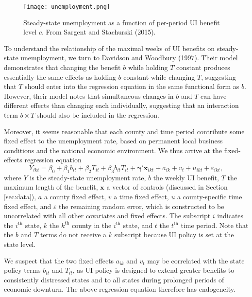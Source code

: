 \documentclass[12pt]{article}
\begin{document}
\begin{figure}[ht!]
	\centering
	\texttt{[image: unemployment.png]}
	\caption{Steady-state unemployment as a function of per-period UI benefit level $c$. From Sargent and Stachurski (2015). \label{fig:unemployment}}
\end{figure}

To understand the relationship of the maximal weeks of UI benefits on steady-state unemployment, we turn to Davidson and Woodbury (1997). Their model demonstrates that changing the benefit $b$ while holding $T$ constant produces essentially the same effects as holding $b$ constant while changing $T$, suggesting that $T$ should enter into the regression equation in the same functional form as $b$. However, their model notes that simultaneous changes in $b$ and $T$ can have different effects than changing each individually, suggesting that an interaction term $b\times T$ should also be included in the regression.

Moreover, it seems reasonable that each county and time period contribute some fixed effect to the unemployment rate, based on permanent local business conditions and the national economic environment. We thus arrive at the fixed-effects regression equation
\begin{equation*} \label{eq:original}
	Y_{ikt} = \beta_0 + \beta_1 b_{it} + \beta_2 T_{it} + \beta_3 b_{it} T_{it} + \boldsymbol{\gamma}'\mathbf{x}_{ikt} + a_{ik} + v_{t} + u_{ikt} + \varepsilon_{ikt},
\end{equation*}
where $Y$ is the steady-state unemployment rate, $b$ the weekly UI benefit, $T$ the maximum length of the benefit, $\mathbf{x}$ a vector of controls (discussed in Section \ref{sec:data}), $a$ a county fixed effect, $v$ a time fixed effect, $u$ a county-specific time fixed effect, and $\varepsilon$ the remaining random error, which is constructed to be uncorrelated with all other covariates and fixed effects. The subscript $i$ indicates the $i^{\text{th}}$ state, $k$ the $k^{\text{th}}$ county in the $i^{\text{th}}$ state, and $t$ the $t^{\text{th}}$ time period. Note that the $b$ and $T$ terms do not receive a $k$ subscript because UI policy is set at the state level.

We suspect that the two fixed effects $a_{ik}$ and $v_{t}$ may be correlated with the state policy terms $b_{it}$ and $T_{it}$, as UI policy is designed to extend greater benefits to consistently distressed states and to all states during prolonged periods of economic downturn. The above regression equation therefore has endogeneity.
\end{document}
